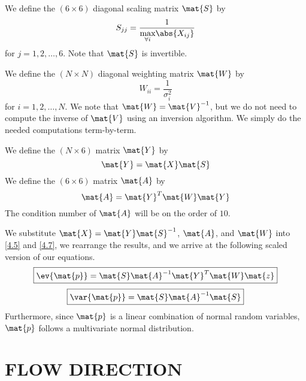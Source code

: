 \documentclass[12pt]{article}
\begin{document}
We define the $(6 \times 6)$ diagonal scaling matrix $\mat{S}$ by
%
\begin{equation}\label{4.8}
    S_{jj} = \dfrac{1}{\underset{\forall i}{\text{max}} \abs{X_{ij}}}
\end{equation}
%
for $j = 1, 2, \ldots, 6$. Note that $\mat{S}$ is invertible.

We define the $(N \times N)$ diagonal weighting matrix $\mat{W}$ by
%
\begin{equation}\label{4.9}
    W_{ii} = \dfrac{1}{\sigma_i^2}
\end{equation}
%
for $i = 1, 2, \ldots, N$. We note that $\mat{W} = \mat{V}^{-1}$, but we do not need to compute the inverse of $\mat{V}$ using an inversion algorithm. We simply do the needed computations term-by-term.

We define the $(N \times 6)$ matrix $\mat{Y}$ by
%
\begin{equation}\label{4.10}
    \mat{Y} = \mat{X} \mat{S}
\end{equation}
%
We define the $(6 \times 6)$ matrix $\mat{A}$ by
%
\begin{equation}\label{4.11}
    \mat{A} = \mat{Y}^{T} \mat{W} \mat{Y}
\end{equation}
%
The condition number of $\mat{A}$ will be on the order of $10$.

We substitute $\mat{X} = \mat{Y} \mat{S}^{-1}$, $\mat{A}$, and $\mat{W}$ into \eqref{4.5} and \eqref{4.7}, we rearrange the results, and we arrive at the following scaled version of our equations.
%
\begin{equation}\label{4.12}
\boxed{
    \ev{\mat{p}} = \mat{S} \mat{A}^{-1} \mat{Y}^T \mat{W} \mat{z}
}
\end{equation}
%
\begin{equation}\label{4.13}
\boxed{
    \var{\mat{p}} = \mat{S} \mat{A}^{-1} \mat{S}
}
\end{equation}
%
Furthermore, since $\mat{p}$ is a linear combination of normal random variables, $\mat{p}$ follows a multivariate normal distribution.


\section{FLOW DIRECTION}
\end{document}
